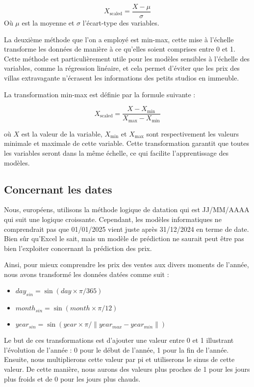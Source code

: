 \documentclass[a4paper,12pt,french]{article}
\begin{document}
\[
X_{\text{scaled}} = \frac{X - \mu}{\sigma}
\]
Où \( \mu \) est la moyenne et \( \sigma \) l'écart-type des variables.

La deuxième méthode que l'on a employé est min-max, cette mise à l'échelle transforme les données de manière à ce qu'elles soient comprises entre 0 et 1. Cette méthode est particulièrement utile pour les modèles sensibles à l'échelle des variables, comme la régression linéaire, et cela permet d'éviter que les prix des villas extravagante n'écrasent les informations des petits studios en immeuble.

La transformation min-max est définie par la formule suivante :

\[
X_{\text{scaled}} = \frac{X - X_{\min}}{X_{\max} - X_{\min}}
\]

où \( X \) est la valeur de la variable, \( X_{\min} \) et \( X_{\max} \) sont respectivement les valeurs minimale et maximale de cette variable. Cette transformation garantit que toutes les variables seront dans la même échelle, ce qui facilite l'apprentissage des modèles.

\subsection{Concernant les dates}
Nous, européens, utilisons la méthode logique de datation qui est JJ/MM/AAAA qui suit une logique croissante. Cependant, les modèles informatiques ne comprendrait pas que 01/01/2025 vient juste après 31/12/2024 en terme de date. Bien sûr qu'Excel le sait, mais un modèle de prédiction ne saurait peut être pas bien l'exploiter concernant la prédiction des prix.

Ainsi, pour mieux comprendre les prix des ventes aux divers moments de l'année, nous avons transformé les données datées comme suit :

\begin{itemize}
    \item $day_{sin} = \sin{(day \times \pi/365)}$
    \item $month_{sin} = \sin{(month \times \pi/12)}$
    \item $year_{sin} = \sin{(year \times \pi/\|year_{max}-year_{min}\|)}$
\end{itemize}

Le but de ces transformations est d'ajouter une valeur entre 0 et 1 illustrant l'évolution de l'année : 0 pour le début de l'année, 1 pour la fin de l'année. Ensuite, nous multiplierons cette valeur par pi et utiliserons le sinus de cette valeur. De cette manière, nous aurons des valeurs plus proches de 1 pour les jours plus froids et de 0 pour les jours plus chauds.
\end{document}
